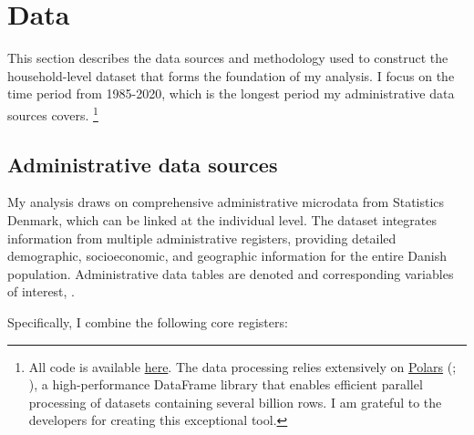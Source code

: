 \documentclass[main.tex]{subfiles}
\begin{document}
\section{Data}
\label{sec:data}

This section describes the data sources and methodology used to construct the household-level dataset that forms the foundation of my analysis. I focus on the time period from 1985-2020, which is the longest period my administrative data sources covers. \footnote{All code is available \href{https://github.com/jorgenhost/mthesis_jbh_schelling}{here}. The data processing relies extensively on \href{https://github.com/pola-rs/polars}{Polars} (\textcite{polars_ritchie_vink_2025}; \textcite{polars_grouper_van_eechoud}), a high-performance DataFrame library that enables efficient parallel processing of datasets containing several billion rows. I am grateful to the developers for creating this exceptional tool.} 

\subsection{Administrative data sources}

My analysis draws on comprehensive administrative microdata from Statistics Denmark, which can be linked at the individual level. The dataset integrates information from multiple administrative registers, providing detailed demographic, socioeconomic, and geographic information for the entire Danish population. Administrative data tables are denoted  and corresponding variables of interest, .

Specifically, I combine the following core registers:
\end{document}
